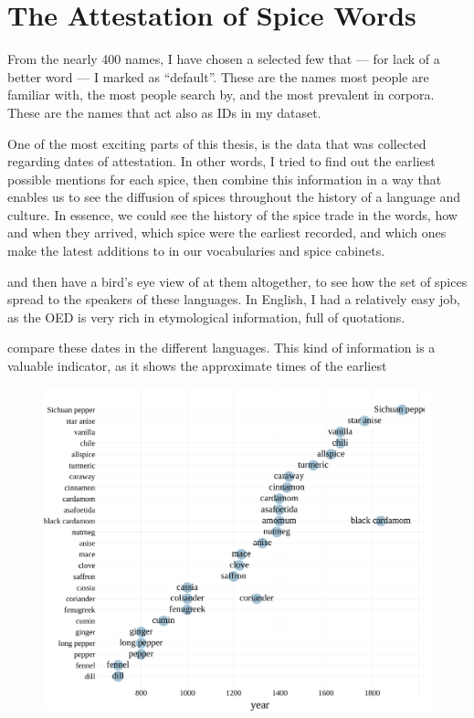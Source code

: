 




\section{The Attestation of Spice Words}

From the nearly 400 names, I have chosen a selected few that --- for lack of a better word --- I marked as ``default''. These are the names most people are familiar with, the most people search by, and the most prevalent in corpora. These are the names that act also as IDs in my dataset. 



One of the most exciting parts of this thesis, is the data that was collected regarding dates of attestation. In other words, I tried to find out the earliest possible mentions for each spice, then combine this information in a way that enables us to see the diffusion of spices throughout the history of a language and culture. In essence, we could see the history of the spice trade in the words, how and when they arrived, which spice were the earliest recorded, and which ones make the latest additions to in our vocabularies and spice cabinets.




and then have a bird's eye view of  at them altogether, to see how the set of spices spread to the speakers of these languages. In English, I had a relatively easy job, as the \gls{OED} is very rich in etymological information, full of quotations. 


compare these dates in the different languages. This kind of information is a valuable indicator, as it shows the approximate times of the earliest 


\begin{figure}[!ht]
  \centering
  \includegraphics[width=\linewidth]{imgs/plots/attestation_en.pdf}
  \caption{}
  \label{fig:set_en}
\end{figure}

